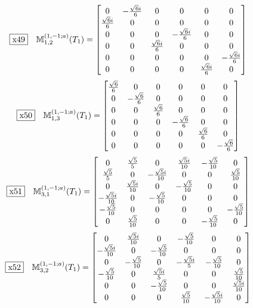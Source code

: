 \documentclass[fleqn,10pt,landscape]{jsarticle}
\begin{document}
\begin{dmath*}
\fbox{x49}\quad \mathbb{M}_{1,2}^{(1,-1;a)}(T_{1})=\begin{bmatrix} 0 & - \frac{\sqrt{6} i}{6} & 0 & 0 & 0 & 0 \\ \frac{\sqrt{6} i}{6} & 0 & 0 & 0 & 0 & 0 \\ 0 & 0 & 0 & - \frac{\sqrt{6} i}{6} & 0 & 0 \\ 0 & 0 & \frac{\sqrt{6} i}{6} & 0 & 0 & 0 \\ 0 & 0 & 0 & 0 & 0 & - \frac{\sqrt{6} i}{6} \\ 0 & 0 & 0 & 0 & \frac{\sqrt{6} i}{6} & 0 \end{bmatrix}
\end{dmath*}
\begin{dmath*}
\fbox{x50}\quad \mathbb{M}_{1,3}^{(1,-1;a)}(T_{1})=\begin{bmatrix} \frac{\sqrt{6}}{6} & 0 & 0 & 0 & 0 & 0 \\ 0 & - \frac{\sqrt{6}}{6} & 0 & 0 & 0 & 0 \\ 0 & 0 & \frac{\sqrt{6}}{6} & 0 & 0 & 0 \\ 0 & 0 & 0 & - \frac{\sqrt{6}}{6} & 0 & 0 \\ 0 & 0 & 0 & 0 & \frac{\sqrt{6}}{6} & 0 \\ 0 & 0 & 0 & 0 & 0 & - \frac{\sqrt{6}}{6} \end{bmatrix}
\end{dmath*}
\begin{dmath*}
\fbox{x51}\quad \mathbb{M}_{3,1}^{(1,-1;a)}(T_{1})=\begin{bmatrix} 0 & \frac{\sqrt{5}}{5} & 0 & \frac{\sqrt{5} i}{10} & - \frac{\sqrt{5}}{10} & 0 \\ \frac{\sqrt{5}}{5} & 0 & - \frac{\sqrt{5} i}{10} & 0 & 0 & \frac{\sqrt{5}}{10} \\ 0 & \frac{\sqrt{5} i}{10} & 0 & - \frac{\sqrt{5}}{10} & 0 & 0 \\ - \frac{\sqrt{5} i}{10} & 0 & - \frac{\sqrt{5}}{10} & 0 & 0 & 0 \\ - \frac{\sqrt{5}}{10} & 0 & 0 & 0 & 0 & - \frac{\sqrt{5}}{10} \\ 0 & \frac{\sqrt{5}}{10} & 0 & 0 & - \frac{\sqrt{5}}{10} & 0 \end{bmatrix}
\end{dmath*}
\begin{dmath*}
\fbox{x52}\quad \mathbb{M}_{3,2}^{(1,-1;a)}(T_{1})=\begin{bmatrix} 0 & \frac{\sqrt{5} i}{10} & 0 & - \frac{\sqrt{5}}{10} & 0 & 0 \\ - \frac{\sqrt{5} i}{10} & 0 & - \frac{\sqrt{5}}{10} & 0 & 0 & 0 \\ 0 & - \frac{\sqrt{5}}{10} & 0 & - \frac{\sqrt{5} i}{5} & - \frac{\sqrt{5}}{10} & 0 \\ - \frac{\sqrt{5}}{10} & 0 & \frac{\sqrt{5} i}{5} & 0 & 0 & \frac{\sqrt{5}}{10} \\ 0 & 0 & - \frac{\sqrt{5}}{10} & 0 & 0 & \frac{\sqrt{5} i}{10} \\ 0 & 0 & 0 & \frac{\sqrt{5}}{10} & - \frac{\sqrt{5} i}{10} & 0 \end{bmatrix}
\end{dmath*}
\end{document}
